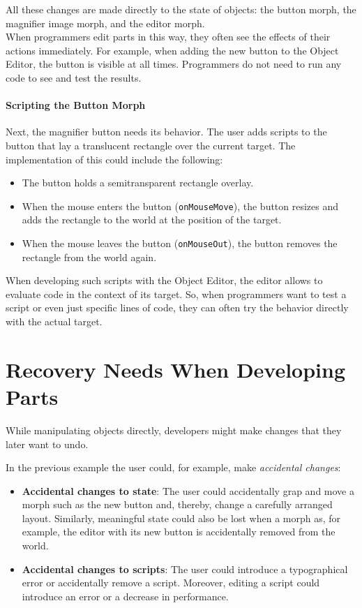 All these changes are made directly to the state of objects: the button morph, the magnifier image morph, and the editor morph.\\
When programmers edit parts in this way, they often see the effects of their actions immediately.
For example, when adding the new button to the Object Editor, the button is visible at all times.
Programmers do not need to run any code to see and test the results.

\paragraph{Scripting the Button Morph}
Next, the magnifier button needs its behavior.
The user adds scripts to the button that lay a translucent rectangle over the current target.
The implementation of this could include the following: 
\begin{itemize}
    \item The button holds a semitransparent rectangle overlay.
    \item When the mouse enters the button (\lstinline{onMouseMove}), the button resizes and adds the rectangle to the world at the position of the target.
    \item When the mouse leaves the button (\lstinline{onMouseOut}), the button removes the rectangle from the world again.
\end{itemize}
 
When developing such scripts with the Object Editor, the editor allows to evaluate code in the context of its target.
So, when programmers want to test a script or even just specific lines of code, they can often try the behavior directly with the actual target.


\section{Recovery Needs When Developing Parts}

While manipulating objects directly, developers might make changes that they later want to undo.

In the previous example the user could, for example, make \emph{accidental changes}:

\begin{itemize}
    \item \textbf{Accidental changes to state}: The user could accidentally grap and move a morph such as the new button and, thereby, change a carefully arranged layout. Similarly, meaningful state could also be lost when a morph as, for example, the editor with its new button is accidentally removed from the world.
    \item \textbf{Accidental changes to scripts}: The user could introduce a typographical error or accidentally remove a script. Moreover, editing a script could introduce an error or a decrease in performance.
\end{itemize}

